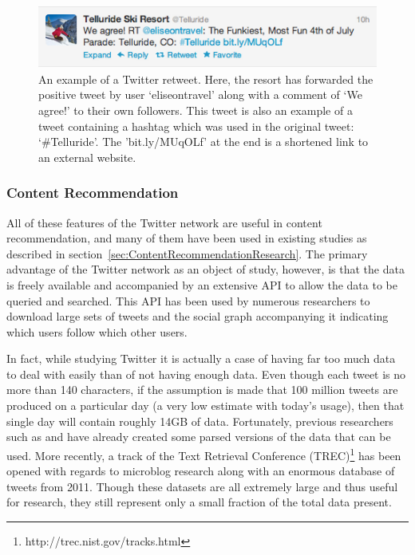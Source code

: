 \begin{center}
\begin{figure}
  \centering
  \includegraphics[width=1\textwidth]{retweet_hashtag_example_figure}
  \caption[Example of a Twitter retweet and hashtag]{An example of a Twitter retweet. Here, the resort has forwarded the positive tweet by user `eliseontravel' along with a comment of `We agree!' to their own followers. This tweet is also an example of a tweet containing a hashtag which was used in the original tweet: `\#Telluride'. The 'bit.ly/MUqOLf' at the end is a shortened link to an external website.}
\label{fig:retweet_hashtag}
\end{figure}
\end{center}


\subsubsection{Content Recommendation}

All of these features of the Twitter network are useful in content recommendation, and many of them have been used in existing studies as described in section~\ref{sec:ContentRecommendationResearch}. The primary advantage of the Twitter network as an object of study, however, is that the data is freely available and accompanied by an extensive API to allow the data to be queried and searched. This API has been used by numerous researchers to download large sets of tweets and the social graph accompanying it indicating which users follow which other users.

In fact, while studying Twitter it is actually a case of having far too much data to deal with easily than of not having enough data. Even though each tweet is no more than 140 characters, if the assumption is made that 100 million tweets are produced on a particular day (a very low estimate with today's usage), then that single day will contain roughly 14GB of data. Fortunately, previous researchers such as \cite{Kwak2010} and \cite{Choudhury2010} have already created some parsed versions of the data that can be used. More recently, a track of the Text Retrieval Conference (TREC)\footnote{http://trec.nist.gov/tracks.html} has been opened with regards to microblog research along with an enormous database of tweets from 2011. Though these datasets are all extremely large and thus useful for research, they still represent only a small fraction of the total data present.

